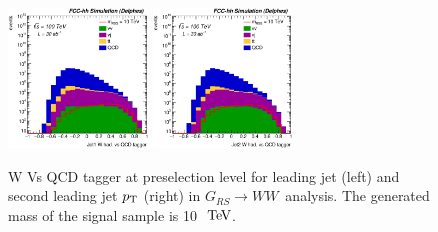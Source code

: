 \documentclass{cernrep}
\newcommand*{\rsg}{\ensuremath{G_{RS} \rightarrow WW}}
\begin{document}
\begin{figure}[!htb]\centering
\includegraphics[width=0.33\textwidth]{Fig/RSGww/Jet1_Whad_vs_QCD_tagger_sel0_nostack_log.eps}
\includegraphics[width=0.33\textwidth]{Fig/RSGww/Jet2_Whad_vs_QCD_tagger_sel0_nostack_log.eps}
\caption{W Vs QCD tagger at preselection level for leading jet (left) and second leading jet $p\sb{\scriptstyle\mathrm{T}}$ (right) in \rsg\ analysis. The generated mass of the signal sample is 10 $\TeV$.}
\label{fig:RSGww_sel0_tagger}
\end{figure}


\end{document}
